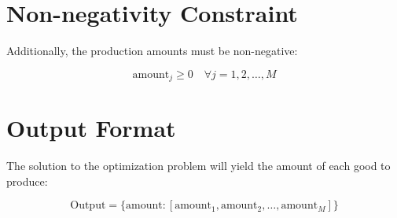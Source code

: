 \documentclass{article}
\begin{document}
\section*{Non-negativity Constraint}

Additionally, the production amounts must be non-negative:

\[
\text{amount}_j \geq 0 \quad \forall j = 1, 2, \ldots, M
\]

\section*{Output Format}

The solution to the optimization problem will yield the amount of each good to produce:

\[
\text{Output} = \{ \text{amount} : [\text{amount}_1, \text{amount}_2, \ldots, \text{amount}_M] \}
\]
\end{document}
